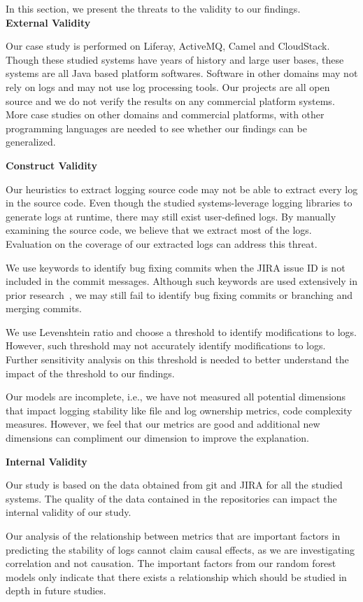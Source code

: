 In this section, we present the threats to the validity to our findings. \\


\noindent \textbf{External Validity}

Our case study is performed on Liferay, ActiveMQ, Camel and CloudStack. Though these studied systems have years of history and large user bases, these systems are all Java based platform softwares.  Software in other domains may not rely on logs and may not use log processing tools. Our projects are all open source and we do not verify the results on any commercial platform systems. More case studies on other domains and commercial platforms, with other programming languages are needed to see whether our findings can be generalized. 



\noindent \textbf{Construct Validity}


Our heuristics to extract logging source code may not be able to extract every log in the source code. Even though the studied systems-leverage logging libraries to generate logs at runtime, there may still exist user-defined logs. By manually examining the source code, we believe that we extract most of the logs. Evaluation on the coverage of our extracted logs can address this threat.


We use keywords to identify bug fixing commits when the JIRA issue ID is not included in the commit messages. Although such keywords are used extensively in prior research~\cite{EMSEIAN}, we may still fail to identify bug fixing commits or branching and merging commits.

We use Levenshtein ratio and choose a threshold to identify modifications to logs. However, such threshold may not accurately identify modifications to logs. Further sensitivity analysis on this threshold is needed to better understand the impact of the threshold to our findings.

Our models are incomplete, i.e., we have not measured all potential dimensions that impact logging stability like file and log ownership metrics, code complexity measures. However, we feel that our metrics are good and additional new dimensions can compliment our dimension to improve the explanation. 

\noindent \textbf{Internal Validity}

Our study is based on the data obtained from git and JIRA for all the studied systems. The quality of the data contained in the repositories can impact the internal validity of our study.

Our analysis of the relationship between metrics that are important factors in predicting the stability of logs cannot claim causal effects, as we are investigating correlation and not causation. The important factors from our random forest models only indicate that there exists a relationship which should be studied in depth in future studies. 



